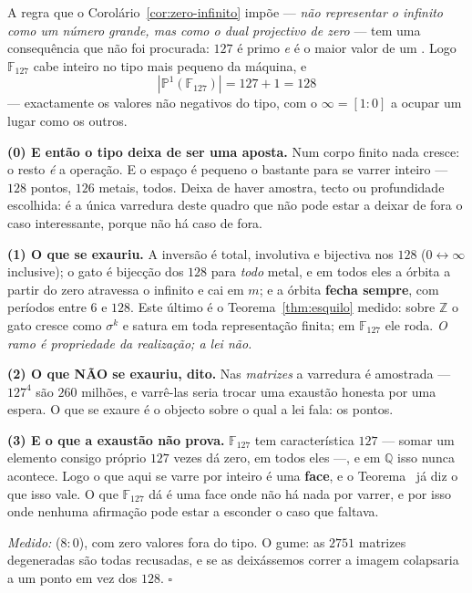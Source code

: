 \documentclass[livro.tex]{subfiles}
\begin{document}
\begin{corolario}\label{cor:exaustao}
A regra que o Corolário~\ref{cor:zero-infinito} impõe --- \emph{não
representar o infinito como um número grande, mas como o dual projectivo
de zero} --- tem uma consequência que não foi procurada: $127$ é primo
\emph{e} é o maior valor de um . Logo $\mathbb{F}_{127}$
cabe inteiro no tipo mais pequeno da máquina, e
\[
\boxed{\;|\mathbb{P}^1(\mathbb{F}_{127})|=127+1=128\;}
\]
--- exactamente os valores não negativos do tipo, com o $\infty=[1:0]$ a
ocupar um lugar como os outros.

\textbf{(0) E então o tipo deixa de ser uma aposta.} Num corpo finito
nada cresce: o resto \emph{é} a operação. E o espaço é pequeno o bastante
para se varrer inteiro --- $128$ pontos, $126$ metais, todos. Deixa de
haver amostra, tecto ou profundidade escolhida: é a única varredura deste
quadro que não pode estar a deixar de fora o caso interessante, porque
não há caso de fora.

\textbf{(1) O que se exauriu.} A inversão é total, involutiva e bijectiva
nos $128$ ($0\leftrightarrow\infty$ inclusive); o gato é bijecção dos
$128$ para \emph{todo} metal, e em todos eles a órbita a partir do zero
atravessa o infinito e cai em $m$; e a órbita \textbf{fecha sempre}, com
períodos entre $6$ e $128$. Este último é o Teorema~\ref{thm:esquilo}
medido: sobre $\mathbb{Z}$ o gato cresce como $\sigma^{k}$ e satura em
toda representação finita; em $\mathbb{F}_{127}$ ele roda. \emph{O ramo é
propriedade da realização; a lei não.}

\textbf{(2) O que NÃO se exauriu, dito.} Nas \emph{matrizes} a varredura
é amostrada --- $127^{4}$ são $260$ milhões, e varrê-las seria trocar uma
exaustão honesta por uma espera. O que se exaure é o objecto sobre o qual
a lei fala: os pontos.

\textbf{(3) E o que a exaustão não prova.} $\mathbb{F}_{127}$ tem
característica $127$ --- somar um elemento consigo próprio $127$ vezes dá
zero, em todos eles ---, e em $\mathbb{Q}$ isso nunca acontece. Logo o
que aqui se varre por inteiro é uma \textbf{face}, e o
Teorema~ já diz o que isso vale. O que $\mathbb{F}_{127}$
dá é uma face onde não há nada por varrer, e por isso onde nenhuma
afirmação pode estar a esconder o caso que faltava.

\emph{Medido:}  ($8{:}0$), com zero valores fora
do tipo. O gume: as $2751$ matrizes degeneradas são todas recusadas, e se
as deixássemos correr a imagem colapsaria a um ponto em vez dos $128$.
$\square$
\end{corolario}
\end{document}
